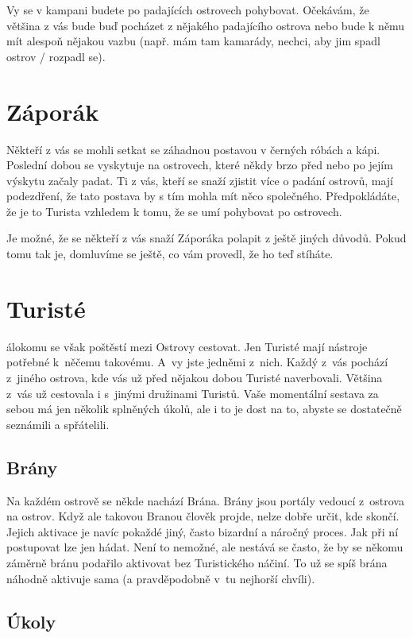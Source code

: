\documentclass[a4paper,twocolumn,openany,nodeprecatedcode, justified]{dndbook}
\begin{document}
	Vy se v kampani budete po padajících ostrovech pohybovat. Očekávám, že
	většina z vás bude buď pocházet z nějakého padajícího ostrova nebo bude k
	němu mít alespoň nějakou vazbu (např. mám tam kamarády, nechci, aby jim
	spadl ostrov / rozpadl se).
	
	\section{Záporák}
	Někteří z vás se mohli setkat se záhadnou postavou v černých róbách a kápi.
	Poslední dobou se vyskytuje na ostrovech, které někdy brzo před nebo po jejím
	výskytu začaly padat. Ti z vás, kteří se snaží zjistit více o padání ostrovů, mají
	podezdření, že tato postava by s tím mohla mít něco společného. Předpokládáte,
	že je to Turista vzhledem k tomu, že se umí pohybovat po ostrovech.
	
	Je možné, že se někteří z vás snaží Záporáka polapit z ještě jiných důvodů.
	Pokud tomu tak je, domluvíme se ještě, co vám provedl, že ho teď stíháte.
	
	
	
	\section{Turisté}
	
	álokomu se však poštěstí mezi Ostrovy cestovat. Jen Turisté mají nástroje potřebné k~něčemu takovému. A~vy jste jedněmi z~nich. Každý z~vás pochází z~jiného ostrova, kde vás už před nějakou dobou Turisté naverbovali. Většina z~vás už cestovala i s~jinými družinami Turistů. Vaše momentální sestava za sebou má jen několik splněných úkolů, ale i to je dost na to, abyste se dostatečně seznámili a spřátelili.
	
	\subsection{Brány}
	
	Na každém ostrově se někde nachází Brána. Brány jsou portály vedoucí z~ostrova na ostrov. Když ale takovou Branou člověk projde, nelze dobře určit, kde skončí. Jejich aktivace je navíc pokaždé jiný, často bizardní a náročný proces. Jak při ní postupovat lze jen hádat. Není to nemožné, ale nestává se často, že by se někomu záměrně bránu podařilo aktivovat bez Turistického náčiní. To už se spíš brána náhodně aktivuje sama (a pravděpodobně v~tu nejhorší chvíli).
	
	\subsection{Úkoly}
	
\end{document}
